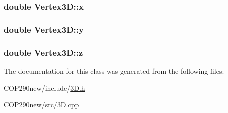 \subsubsection[{\texorpdfstring{x}{x}}]{\setlength{\rightskip}{0pt plus 5cm}double Vertex3\+D\+::x}\hypertarget{class_vertex3_d_a4f2e1e52715d4838267984cda8f69a81}{}\label{class_vertex3_d_a4f2e1e52715d4838267984cda8f69a81}
\subsubsection[{\texorpdfstring{y}{y}}]{\setlength{\rightskip}{0pt plus 5cm}double Vertex3\+D\+::y}\hypertarget{class_vertex3_d_a494593d78f61f44b90df1dce15edeb62}{}\label{class_vertex3_d_a494593d78f61f44b90df1dce15edeb62}
\subsubsection[{\texorpdfstring{z}{z}}]{\setlength{\rightskip}{0pt plus 5cm}double Vertex3\+D\+::z}\hypertarget{class_vertex3_d_ae899efc1434544b4e179cb15b2a55491}{}\label{class_vertex3_d_ae899efc1434544b4e179cb15b2a55491}


The documentation for this class was generated from the following files\+:\begin{DoxyCompactItemize}
\item 
C\+O\+P290new/include/\hyperlink{3_d_8h}{3\+D.\+h}\item 
C\+O\+P290new/src/\hyperlink{3_d_8cpp}{3\+D.\+cpp}\end{DoxyCompactItemize}
